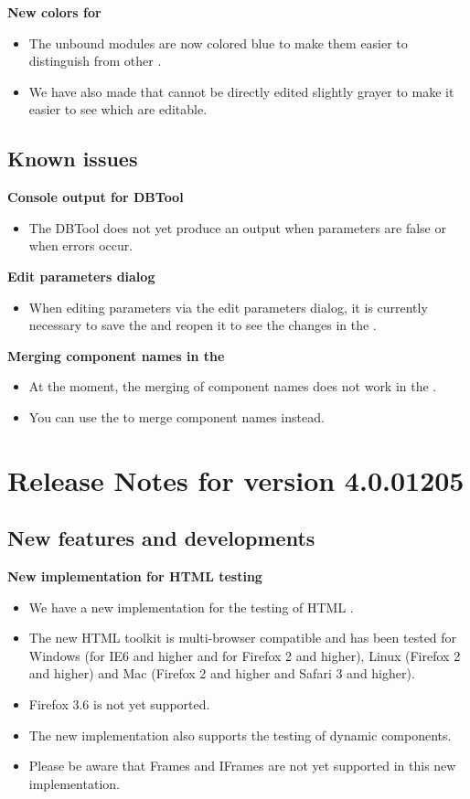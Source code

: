 \textbf{New colors for \gdcases{}}
\begin{itemize}
\item The unbound modules are now colored blue to make them easier to distinguish from other \gdcases{}.
\item We have also made \gdcases{} that cannot be directly edited slightly grayer to make it easier to see which \gdcases{} are editable. 
\end{itemize}

\subsection{Known issues}

\textbf{Console output for DBTool}
\begin{itemize}
\item The DBTool does not yet produce an output when parameters are false or when errors occur.
\end{itemize}

\textbf{Edit parameters dialog}
\begin{itemize}
\item When editing parameters via the edit parameters dialog, it is currently necessary to save the \gdcase{} and reopen it to see the changes in the \gdpropview{}.
\end{itemize}
\textbf{Merging component names in the \gdomeditor{}}
\begin{itemize}
\item At the moment, the merging of component names does not work in the \gdomeditor{}. 
\item You can use the \gdcompnamebrowser{} to merge component names instead.
\end{itemize}

\makeatletter
\section{Release Notes for version 4.0.01205}
\makeatother
\subsection{New features and developments}
\textbf{New implementation for HTML testing}
\begin{itemize}
\item We have a new implementation for the testing of HTML \gdauts{}.
\item The new HTML toolkit is multi-browser compatible and has been tested for Windows (for IE6 and higher and for Firefox 2 and higher), Linux (Firefox 2 and higher) and Mac (Firefox 2 and higher and Safari 3 and higher).
\item Firefox 3.6 is not yet supported.
\item The new implementation also supports the testing of dynamic components. 
\item Please be aware that Frames and IFrames are not yet supported in this new implementation. 

\end{itemize}

